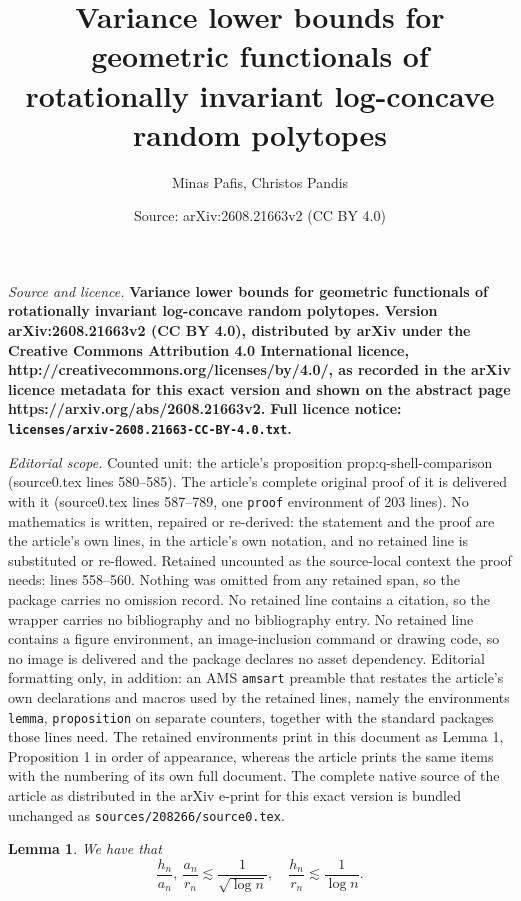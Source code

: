 \documentclass[10pt,a4paper]{amsart}
\title{\bf Variance lower bounds for geometric functionals of rotationally invariant log-concave random polytopes}
\author{Minas Pafis, Christos Pandis}
\date{Source: arXiv:2608.21663v2 (CC BY 4.0)}
\newtheorem{lemma}{Lemma}
\begin{document}
\maketitle

\noindent\emph{Source and licence.} \bf Variance lower bounds for geometric functionals of rotationally invariant log-concave random polytopes. Version arXiv:2608.21663v2 (CC BY 4.0), distributed by arXiv under the Creative Commons Attribution 4.0 International licence, http://creativecommons.org/licenses/by/4.0/, as recorded in the arXiv licence metadata for this exact version and shown on the abstract page https://arxiv.org/abs/2608.21663v2. Full licence notice: \texttt{licenses/arxiv-2608.21663-CC-BY-4.0.txt}.\par\smallskip

\noindent\textit{Editorial scope.} Counted unit: the article's proposition prop:q-shell-comparison (source0.tex lines 580--585). The article's complete original proof of it is delivered with it (source0.tex lines 587--789, one \texttt{proof} environment of 203 lines). No mathematics is written, repaired or re-derived: the statement and the proof are the article's own lines, in the article's own notation, and no retained line is substituted or re-flowed.  Retained uncounted as the source-local context the proof needs: lines 558--560.  Nothing was omitted from any retained span, so the package carries no omission record.  No retained line contains a citation, so the wrapper carries no bibliography and no bibliography entry.  No retained line contains a figure environment, an image-inclusion command or drawing code, so no image is delivered and the package declares no asset dependency.  Editorial formatting only, in addition: an AMS \texttt{amsart} preamble that restates the article's own declarations and macros used by the retained lines, namely the environments \texttt{lemma}, \texttt{proposition} on separate counters, together with the standard packages those lines need.  The retained environments print in this document as Lemma 1, Proposition 1 in order of appearance, whereas the article prints the same items with the numbering of its own full document.  The complete native source of the article as distributed in the arXiv e-print for this exact version is bundled unchanged as \texttt{sources/208266/source0.tex}.
\begin{lemma}\label{lem:relations}
We have that \[\frac{h_n}{a_n}, \ \frac{a_n}{r_n} \lesssim \frac{1}{\sqrt{\log n}}, \quad \frac{h_n}{r_n} \lesssim \frac{1}{\log n}.\]  
\end{lemma}
\end{document}
